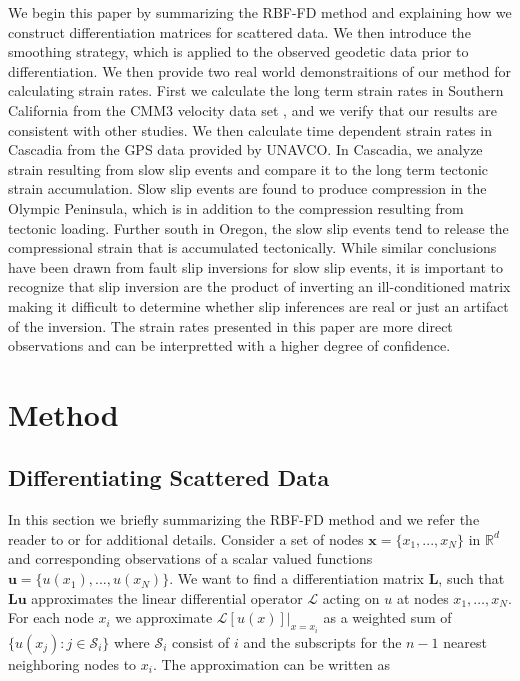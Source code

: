 \documentclass[10pt,a4paper]{article}
\begin{document}
We begin this paper by summarizing the RBF-FD method and explaining how we construct differentiation matrices for scattered data. We then introduce the smoothing strategy, which is applied to the observed geodetic data prior to differentiation.  We then provide two real world demonstraitions of our method for calculating strain rates.  First we calculate the long term strain rates in Southern California from the CMM3 velocity data set \citep{Shen2011}, and we verify that our results are consistent with other studies. We then calculate time dependent strain rates in Cascadia from the GPS data provided by UNAVCO.  In Cascadia, we analyze strain resulting from slow slip events and compare it to the long term tectonic strain accumulation. Slow slip events are found to produce compression in the Olympic Peninsula, which is in addition to the compression resulting from tectonic loading.  Further south in Oregon, the slow slip events tend to release the compressional strain that is accumulated tectonically.  While similar conclusions have been drawn from fault slip inversions for slow slip events, it is important to recognize that slip inversion are the product of inverting an ill-conditioned matrix making it difficult to determine whether slip inferences are real or just an artifact of the inversion.  The strain rates presented in this paper are more direct observations and can be interpretted with a higher degree of confidence. 

\section{Method}\label{sec:Method}
\subsection{Differentiating Scattered Data}\label{sec:Differentiating}

In this section we briefly summarizing the RBF-FD method and we refer the reader to \citet{Wright2006} or \citet{Fornberg2015} for additional details. Consider a set of nodes $\mathbf{x} = \{x_1, ..., x_N\}$ in $\mathbb{R}^d$ and corresponding observations of a scalar valued functions $\mathbf{u} = \{u(x_1), ..., u(x_N)\}$.  We want to find a differentiation matrix $\mathbf{L}$, such that $\mathbf{Lu}$ approximates the linear differential operator $\mathcal{L}$ acting on $u$ at nodes $x_1, \dots, x_N$.  For each node $x_i$ we approximate $\mathcal{L}[u(x)]\big|_{x=x_i}$ as a weighted sum of $\{u(x_j): j \in \mathcal{S}_i\}$ where $\mathcal{S}_i$ consist of $i$ and the subscripts for the $n-1$ nearest neighboring nodes to $x_i$.  The approximation can be written as
\end{document}
